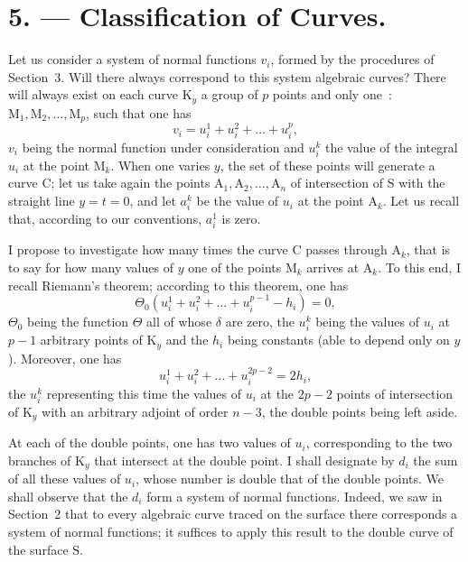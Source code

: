 \documentclass{article}
\begin{document}
\section*{5. --- Classification of Curves.}

Let us consider a system of normal functions $v_{i}$, formed by the procedures of Section~3. Will there always correspond to this system algebraic curves? There will always exist on each curve $\mathrm{K}_{y}$ a group of $p$ points and only one~: $\mathrm{M}_{1}, \mathrm{M}_{2}, \ldots, \mathrm{M}_{p}$, such that one has
\[
v_{i} = u_{i}^{1} + u_{i}^{2} + \ldots + u_{i}^{p},
\]
$v_{i}$ being the normal function under consideration and $u_{i}^{k}$ the value of the integral $u_{i}$ at the point $\mathrm{M}_{k}$. When one varies $y$, the set of these points will generate a curve $\mathrm{C}$; let us take again the points $\mathrm{A}_{1}, \mathrm{A}_{2}, \ldots, \mathrm{A}_{n}$ of intersection of $\mathrm{S}$ with the straight line $y = t = 0$, and let $a_{i}^{k}$ be the value of $u_{i}$ at the point $\mathrm{A}_{k}$. Let us recall that, according to our conventions, $a_{i}^{1}$ is zero.

I propose to investigate how many times the curve $\mathrm{C}$ passes through $\mathrm{A}_{k}$, that is to say for how many values of $y$ one of the points $\mathrm{M}_{k}$ arrives at $\mathrm{A}_{k}$. To this end, I recall Riemann's theorem; according to this theorem, one has
\[
\Theta_{0}(u_{i}^{1} + u_{i}^{2} + \ldots + u_{i}^{p-1} - h_{i}) = 0, \tag{1}
\]
$\Theta_{0}$ being the function $\Theta$ all of whose $\delta$ are zero, the $u_{i}^{k}$ being the values of $u_{i}$ at $p - 1$ arbitrary points of $\mathrm{K}_{y}$ and the $h_{i}$ being constants (able to depend only on $y$). Moreover, one has
\[
u_{i}^{1} + u_{i}^{2} + \ldots + u_{i}^{2p-2} = 2h_{i}, \tag{2}
\]
the $u_{i}^{k}$ representing this time the values of $u_{i}$ at the $2p - 2$ points of intersection of $\mathrm{K}_{y}$ with an arbitrary adjoint of order $n - 3$, the double points being left aside.

At each of the double points, one has two values of $u_{i}$, corresponding to the two branches of $\mathrm{K}_{y}$ that intersect at the double point. I shall designate by $d_{i}$ the sum of all these values of $u_{i}$, whose number is double that of the double points. We shall observe that the $d_{i}$ form a system of normal functions. Indeed, we saw in Section~2 that to every algebraic curve traced on the surface there corresponds a system of normal functions; it suffices to apply this result to the double curve of the surface $\mathrm{S}$.
\end{document}
